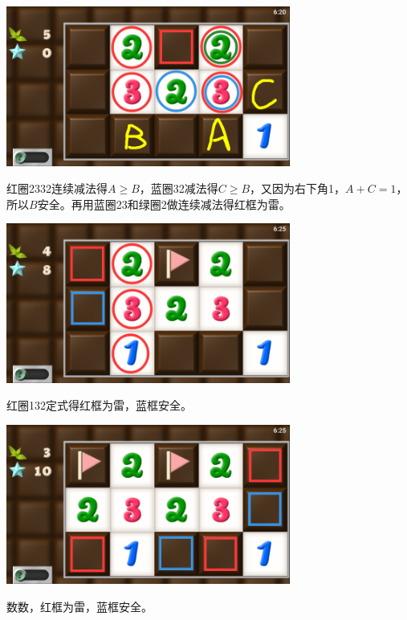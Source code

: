 \subsection{} %
\begin{center}
    \includegraphics[width=0.7\textwidth]{puzzle/105-1.png}
\end{center}
红圈2332连续减法得$A\ge B$，蓝圈32减法得$C\ge B$，又因为右下角1，$A+C=1$，所以$B$安全。再用蓝圈23和绿圈2做连续减法得红框为雷。
\begin{center}
    \includegraphics[width=0.7\textwidth]{puzzle/105-2.png}
\end{center}
红圈132定式得红框为雷，蓝框安全。
\begin{center}
    \includegraphics[width=0.7\textwidth]{puzzle/105-3.png}
\end{center}
数数，红框为雷，蓝框安全。

